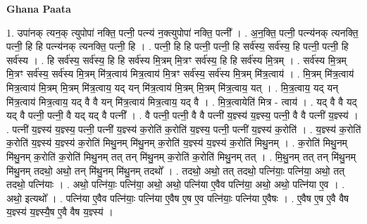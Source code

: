 \documentclass[17pt]{extarticle}
\begin{document}
\textbf{Ghana Paata } \newline

1. उपा॑नक् त्यन॒क् त्युपोपा॑ नक्ति॒ पत्नी॒ पत्न्य॑ न॒क्त्युपोपा॑ नक्ति॒ पत्नी᳚ । . अ॒न॒क्ति॒ पत्नी॒ पत्न्य॑नक् त्यनक्ति॒ पत्नी॒ हि हि पत्न्य॑नक् त्यनक्ति॒ पत्नी॒ हि । . पत्नी॒ हि हि पत्नी॒ पत्नी॒ हि सर्व॑स्य॒ सर्व॑स्य॒ हि पत्नी॒ पत्नी॒ हि सर्व॑स्य । . हि सर्व॑स्य॒ सर्व॑स्य॒ हि हि सर्व॑स्य मि॒त्रम् मि॒त्रꣳ सर्व॑स्य॒ हि हि सर्व॑स्य मि॒त्रम् । . सर्व॑स्य मि॒त्रम् मि॒त्रꣳ सर्व॑स्य॒ सर्व॑स्य मि॒त्रम् मि॑त्र॒त्वाय॑ मित्र॒त्वाय॑ मि॒त्रꣳ सर्व॑स्य॒ सर्व॑स्य मि॒त्रम् मि॑त्र॒त्वाय॑ । . मि॒त्रम् मि॑त्र॒त्वाय॑ मित्र॒त्वाय॑ मि॒त्रम् मि॒त्रम् मि॑त्र॒त्वाय॒ यद् यन् मि॑त्र॒त्वाय॑ मि॒त्रम् मि॒त्रम् मि॑त्र॒त्वाय॒ यत् । . मि॒त्र॒त्वाय॒ यद् यन् मि॑त्र॒त्वाय॑ मित्र॒त्वाय॒ यद् वै वै यन् मि॑त्र॒त्वाय॑ मित्र॒त्वाय॒ यद् वै । . मि॒त्र॒त्वायेति॑ मित्र - त्वाय॑ । . यद् वै वै यद् यद् वै पत्नी॒ पत्नी॒ वै यद् यद् वै पत्नी᳚ । . वै पत्नी॒ पत्नी॒ वै वै पत्नी॑ य॒ज्ञ्स्य॑ य॒ज्ञ्स्य॒ पत्नी॒ वै वै पत्नी॑ य॒ज्ञ्स्य॑ । . पत्नी॑ य॒ज्ञ्स्य॑ य॒ज्ञ्स्य॒ पत्नी॒ पत्नी॑ य॒ज्ञ्स्य॑ क॒रोति॑ क॒रोति॑ य॒ज्ञ्स्य॒ पत्नी॒ पत्नी॑ य॒ज्ञ्स्य॑ क॒रोति॑ । . य॒ज्ञ्स्य॑ क॒रोति॑ क॒रोति॑ य॒ज्ञ्स्य॑ य॒ज्ञ्स्य॑ क॒रोति॑ मिथु॒नम् मि॑थु॒नम् क॒रोति॑ य॒ज्ञ्स्य॑ य॒ज्ञ्स्य॑ क॒रोति॑ मिथु॒नम् । . क॒रोति॑ मिथु॒नम् मि॑थु॒नम् क॒रोति॑ क॒रोति॑ मिथु॒नम् तत् तन् मि॑थु॒नम् क॒रोति॑ क॒रोति॑ मिथु॒नम् तत् । . मि॒थु॒नम् तत् तन् मि॑थु॒नम् मि॑थु॒नम् तदथो॒ अथो॒ तन् मि॑थु॒नम् मि॑थु॒नम् तदथो᳚ । . तदथो॒ अथो॒ तत् तदथो॒ पत्नि॑याः॒ पत्नि॑या॒ अथो॒ तत् तदथो॒ पत्नि॑याः । . अथो॒ पत्नि॑याः॒ पत्नि॑या॒ अथो॒ अथो॒ पत्नि॑या ए॒वैव पत्नि॑या॒ अथो॒ अथो॒ पत्नि॑या ए॒व । . अथो॒ इत्यथो᳚ । . पत्नि॑या ए॒वैव पत्नि॑याः॒ पत्नि॑या ए॒वैष ए॒ष ए॒व पत्नि॑याः॒ पत्नि॑या ए॒वैषः । . ए॒वैष ए॒ष ए॒वै वैष य॒ज्ञ्स्य॑ य॒ज्ञ्स्यै॒ष ए॒वै वैष य॒ज्ञ्स्य॑ । \newline
\end{document}
